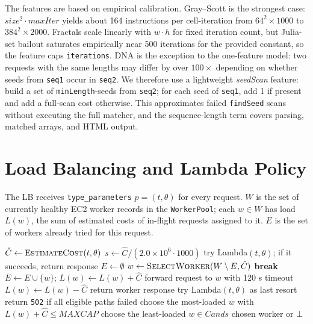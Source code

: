 \documentclass[10pt]{article}
\begin{document}
The features are based on empirical calibration. Gray--Scott is the strongest case: $size^2\cdot maxIter$ yields about 164 instructions per cell-iteration from $64^2\times1000$ to $384^2\times2000$. Fractals scale linearly with $w\cdot h$ for fixed iteration count, but Julia-set bailout saturates empirically near 500 iterations for the provided constant, so the feature caps \texttt{iterations}. DNA is the exception to the one-feature model: two requests with the same lengths may differ by over $100\times$ depending on whether seeds from \texttt{seq1} occur in \texttt{seq2}. We therefore use a lightweight \emph{seedScan} feature: build a set of \texttt{minLength}-seeds from \texttt{seq2}; for each seed of \texttt{seq1}, add 1 if present and add a full-scan cost otherwise. This approximates failed \texttt{findSeed} scans without executing the full matcher, and the sequence-length term covers parsing, matched arrays, and HTML output.

\section{Load Balancing and Lambda Policy}

The LB receives \texttt{type\_parameters} $p=(t,\theta)$ for every request. $W$ is the set of currently healthy EC2 worker records in the \texttt{WorkerPool}; each $w\in W$ has load $L(w)$, the sum of estimated costs of in-flight requests assigned to it. $E$ is the set of workers already tried for this request.

\begin{algorithm}[H]
\caption{Cost-aware routing with EC2 retry and Lambda fallback}
\label{alg:lb}
\begin{algorithmic}[1]
  \State $\hat{C} \gets \Call{EstimateCost}{t,\theta}$
  \State $s \gets \hat{C}/(2.0\times10^6\cdot1000)$ 
    \State try Lambda$(t,\theta)$; if it succeeds, return response
  \EndIf
  \State $E\gets\emptyset$
    \State $w\gets\Call{SelectWorker}{W\setminus E,\hat{C}}$
      \State \textbf{break}
    \EndIf
    \State $E\gets E\cup\{w\}$; $L(w)\gets L(w)+\hat{C}$
    \State forward request to $w$ with 120 s timeout
    \State $L(w)\gets L(w)-\hat{C}$
      \State return worker response
    \EndIf
  \EndFor
    \State try Lambda$(t,\theta)$ as last resort
  \EndIf
  \State return \texttt{502} if all eligible paths failed
\EndProcedure
{}
  \State choose the most-loaded $w$ with $L(w)+\hat{C}\leq MAXCAP$
    \State choose the least-loaded $w\in Cands$
  \EndIf
  \State \Return chosen worker or $\bot$
\EndProcedure
\end{algorithmic}
\end{algorithm}
\end{document}
